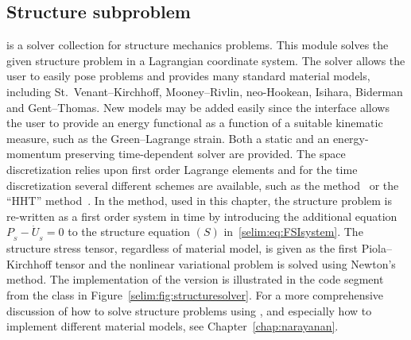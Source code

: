 \subsection{Structure subproblem}

 is a solver collection for structure mechanics
problems. This module solves the given structure problem in a
Lagrangian coordinate system.  The solver allows the user to easily
pose problems and provides many standard material models, including
St.~Venant--Kirchhoff, Mooney--Rivlin, neo-Hookean, Isihara, Biderman
and Gent--Thomas. New models may be added easily since the interface
allows the user to provide an energy functional as a function of a
suitable kinematic measure, such as the Green--Lagrange strain. Both a
static and an energy-momentum preserving time-dependent solver are
provided. The space discretization relies upon first order Lagrange
elements and for the time discretization several different schemes are
available, such as the \cgone{}
method~\citep{ErikssonEstepHansboEtAl1996} or the ``HHT''
method~\citep{HilberHughesTaylor1977}.  In the \cgone{} method, used in
this chapter, the structure problem is re-written as a first order
system in time by introducing the additional equation $P_{_{S}} -
\dot{U}_{_{S}} = 0$ to the structure equation $(S)$
in~\eqref{selim:eq:FSIsystem}. The structure stress tensor, regardless
of material model, is given as the first Piola--Kirchhoff tensor and
the nonlinear variational problem is solved using Newton's method.
The implementation of the \cgone{} version is illustrated in the code
segment from the class  in
Figure~\ref{selim:fig:structuresolver}. For a more comprehensive
discussion of how to solve structure problems using ,
and especially how to implement different material models, see
Chapter~\ref{chap:narayanan}.

